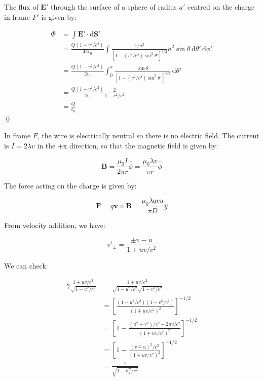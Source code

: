 \documentclass[12pt]{article}
\begin{document}
The flux of $\mathbf{E}'$ through the surface of a sphere of radius $a'$ centred on the charge in frame $F'$ is given by:

\begin{equation}
\begin{split}
    \Phi &= \int \mathbf{E}' \cdot \mathrm{d}\mathbf{S}' \\
    &= \frac{Q(1 - v^{2}/c^{2})}{4\pi\epsilon_0} \int \frac{1/a^{2}}{[1 - (v^{2}/c^{2}) \sin^{2}{\theta'}]^{3/2}} a^{2} \sin{\theta} \, \mathrm{d}\theta' \, \mathrm{d}\phi' \\
    &= \frac{Q(1 - v^{2}/c^{2})}{2\epsilon_0} \int_{0}^{\pi} \frac{\sin{\theta}}{[1 - (v^{2}/c^{2}) \sin^{2}{\theta'}]^{3/2}} \, \mathrm{d}\theta' \\
    &= \frac{Q(1 - v^{2}/c^{2})}{2\epsilon_0} \frac{2}{1 - v^{2}/c^{2}} \\
    &= \frac{Q}{\epsilon_0}
\end{split}
\end{equation}
\qed



In frame $F$, the wire is electrically neutral so there is no electric field. The current is $I = 2\lambda v$ in the +x direction, so that the magnetic field is given by:

\begin{equation}
    \mathbf{B} = \frac{\mu_{0} I}{2\pi r} \hat{\phi} = \frac{\mu_{0} \lambda v}{\pi r} \hat{\phi}
\end{equation}

The force acting on the charge is given by:

\begin{equation}
    \mathbf{F} = q\mathbf{v} \times \mathbf{B} = \frac{\mu_{0} \lambda q vu}{\pi D} \hat{y}
\end{equation}

From velocity addition, we have:

\begin{equation}
    v'_{\pm} = \frac{\pm v - u}{1 \mp uv/c^{2}}
\end{equation}

We can check:

\begin{equation}
\begin{split}
    \gamma \frac{1 \mp uv/c^{2}}{\sqrt{1 - u^{2}/c^{2}}} &= \frac{1 \mp uv/c^{2}}{\sqrt{1 - u^{2}/c^{2}} \sqrt{1 - v^{2}/c^{2}}} \\
    &= \left[ \frac{(1 - u^{2}/c^{2})(1 - v^{2}/c^{2})}{(1 \mp uv/c^{2})^{2}} \right]^{-1/2} \\
    &= \left[ 1 - \frac{(u^{2} + v^{2})/c^{2} \mp 2uv/c^{2}}{(1 \mp uv/c^{2})^{2}} \right]^{-1/2} \\
    &= \left[ 1 - \frac{(v \mp u)^{2}/c^{2}}{(1 \mp uv/c^{2})^{2}} \right]^{-1/2} \\
    &= \frac{1}{\sqrt{1 - v_{\pm}^{'2}/c^{2}}}
\end{split}
\end{equation}
\end{document}
